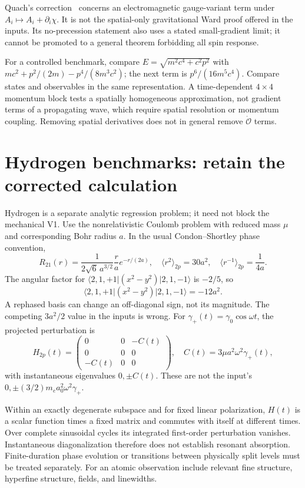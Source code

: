 \documentclass[a4paper,11pt]{article}
\newcommand{\ket}[1]{\lvert #1\rangle}
\newcommand{\bra}[1]{\langle #1\rvert}
\begin{document}
Quach's correction~\cite{quach} concerns an electromagnetic gauge-variant term under $A_i\mapsto A_i+\partial_i\chi$. It is not the spatial-only gravitational Ward proof offered in the inputs. Its no-precession statement also uses a stated small-gradient limit; it cannot be promoted to a general theorem forbidding all spin response.

For a controlled benchmark, compare $E=\sqrt{m^2c^4+c^2p^2}$ with $mc^2+p^2/(2m)-p^4/(8m^3c^2)$; the next term is $p^6/(16m^5c^4)$. Compare states and observables in the same representation. A time-dependent $4\times4$ momentum block tests a spatially homogeneous approximation, not gradient terms of a propagating wave, which require spatial resolution or momentum coupling. Removing spatial derivatives does not in general remove $\dot{\mathcal O}$ terms.

\section{Hydrogen benchmarks: retain the corrected calculation}
\label{sec:hydrogen}

Hydrogen is a separate analytic regression problem; it need not block the mechanical V1. Use the nonrelativistic Coulomb problem with reduced mass $\mu$ and corresponding Bohr radius $a$. In the usual Condon--Shortley phase convention,
\begin{equation}
 R_{21}(r)=\frac1{2\sqrt6\,a^{3/2}}\frac ra e^{-r/(2a)},\quad
 \langle r^2\rangle_{2p}=30a^2,\quad \langle r^{-1}\rangle_{2p}=\frac1{4a}.
\end{equation}
The angular factor for $\bra{2,1,+1}(x^2-y^2)\ket{2,1,-1}$ is $-2/5$, so
\begin{equation}
 \bra{2,1,+1}(x^2-y^2)\ket{2,1,-1}=-12a^2.
\end{equation}
A rephased basis can change an off-diagonal sign, not its magnitude. The competing $3a^2/2$ value in the inputs is wrong. For $\gamma_+(t)=\gamma_0\cos\omega t$, the projected perturbation is
\begin{equation}
 H_{2p}(t)=\begin{pmatrix}0&0&-C(t)\\0&0&0\\-C(t)&0&0\end{pmatrix},\quad
 C(t)=3\mu a^2\omega^2\gamma_+(t),
\end{equation}
with instantaneous eigenvalues $0,\pm C(t)$. These are not the input's $0,\pm(3/2)m_ea_0^2\omega^2\gamma_+$.

Within an exactly degenerate subspace and for fixed linear polarization, $H(t)$ is a scalar function times a fixed matrix and commutes with itself at different times. Over complete sinusoidal cycles its integrated first-order perturbation vanishes. Instantaneous diagonalization therefore does not establish resonant absorption. Finite-duration phase evolution or transitions between physically split levels must be treated separately. For an atomic observation include relevant fine structure, hyperfine structure, fields, and linewidths.
\end{document}
